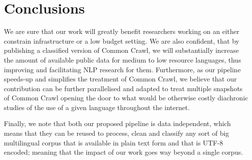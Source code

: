 \section{Conclusions}

We are sure that our work will greatly benefit researchers working on an either constrain infrastructure or a low budget setting. We are also confident, that by publishing a classified version of Common Crawl, we will substantially increase the amount of available public data for medium to low resource languages, thus improving and facilitating NLP research for them. Furthermore, as our pipeline speeds-up and simplifies the treatment of Common Crawl, we believe that our contribution can be further parallelised and adapted to treat multiple snapshots of Common Crawl opening the door to what would be otherwise costly diachronic studies of the use of a given language throughout the internet.

Finally, we note that both our proposed pipeline is data independent, which means that they can be reused to process, clean and classify any sort of big multilingual corpus that is available in plain text form and that is UTF-8 encoded; meaning that the impact of our work goes way beyond a single corpus.